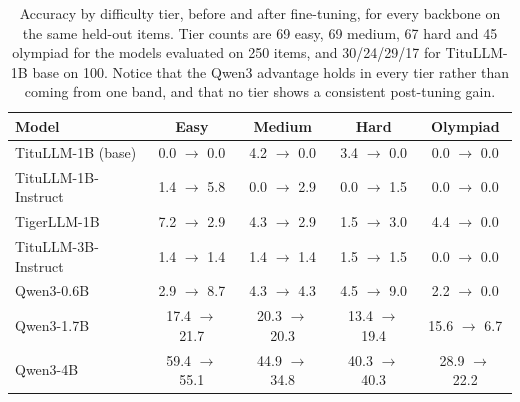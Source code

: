 \begin{table}[t]
\caption{Accuracy by difficulty tier, before and after fine-tuning, for
every backbone on the same held-out items. Tier counts are 69 easy, 69
medium, 67 hard and 45 olympiad for the models evaluated on 250 items,
and 30/24/29/17 for TituLLM-1B base on 100. Notice that the Qwen3
advantage holds in every tier rather than coming from one band, and that
no tier shows a consistent post-tuning gain.}
\label{tab:difficulty}
\centering\small
\begin{tabular}{|l|c|c|c|c|}
\hline
\textbf{Model} & \textbf{Easy} & \textbf{Medium} & \textbf{Hard} & \textbf{Olympiad} \\
\hline
TituLLM-1B (base) & 0.0 $\rightarrow$ 0.0 & 4.2 $\rightarrow$ 0.0 & 3.4 $\rightarrow$ 0.0 & 0.0 $\rightarrow$ 0.0 \\
TituLLM-1B-Instruct & 1.4 $\rightarrow$ 5.8 & 0.0 $\rightarrow$ 2.9 & 0.0 $\rightarrow$ 1.5 & 0.0 $\rightarrow$ 0.0 \\
TigerLLM-1B & 7.2 $\rightarrow$ 2.9 & 4.3 $\rightarrow$ 2.9 & 1.5 $\rightarrow$ 3.0 & 4.4 $\rightarrow$ 0.0 \\
TituLLM-3B-Instruct & 1.4 $\rightarrow$ 1.4 & 1.4 $\rightarrow$ 1.4 & 1.5 $\rightarrow$ 1.5 & 0.0 $\rightarrow$ 0.0 \\
Qwen3-0.6B & 2.9 $\rightarrow$ 8.7 & 4.3 $\rightarrow$ 4.3 & 4.5 $\rightarrow$ 9.0 & 2.2 $\rightarrow$ 0.0 \\
Qwen3-1.7B & 17.4 $\rightarrow$ 21.7 & 20.3 $\rightarrow$ 20.3 & 13.4 $\rightarrow$ 19.4 & 15.6 $\rightarrow$ 6.7 \\
Qwen3-4B & 59.4 $\rightarrow$ 55.1 & 44.9 $\rightarrow$ 34.8 & 40.3 $\rightarrow$ 40.3 & 28.9 $\rightarrow$ 22.2 \\
\hline
\end{tabular}
\end{table}